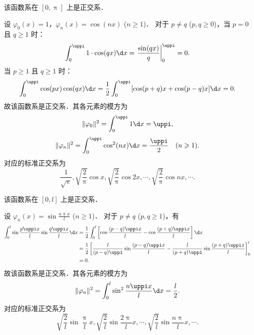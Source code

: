\begin{myproof}
    该函数系在 $[0, \uppi]$ 上是正交系．

    设 $\varphi_0(x) = 1$，$\varphi_n(x) = \cos(nx)$ ($n \geqslant 1$)．
    对于 $p \neq q$ ($p, q \geqslant 0$)，当 $p=0$ 且 $q \geqslant 1$ 时：
    \begin{equation}\label{eq:orth-1-1}
        \int_{0}^{\uppi} 1 \cdot \cos(qx) \d x = \left. \frac{\sin(qx)}{q} \right|_{0}^{\uppi} = 0.
    \end{equation}
    当 $p \geqslant 1$ 且 $q \geqslant 1$ 时：
    \begin{equation}\label{eq:orth-1-2}
        \int_{0}^{\uppi} \cos(px) \cos(qx) \d x = \frac{1}{2} \int_{0}^{\uppi} [\cos(p+q)x + \cos(p-q)x] \d x = 0.
    \end{equation}
    故该函数系是正交系．其各元素的模方为
    \begin{equation}\label{eq:norm-1-1}
        \|\varphi_0\|^2 = \int_{0}^{\uppi} 1 \d x = \uppi,
    \end{equation}
    \begin{equation}\label{eq:norm-1-2}
        \|\varphi_n\|^2 = \int_{0}^{\uppi} \cos^2(nx) \d x = \frac{\uppi}{2} \quad (n \geqslant 1).
    \end{equation}
    对应的标准正交系为
    \begin{equation}
        \boxed{\frac{1}{\sqrt{\uppi}}, \sqrt{\frac{2}{\uppi}}\cos x, \sqrt{\frac{2}{\uppi}}\cos 2x, \cdots, \sqrt{\frac{2}{\uppi}}\cos nx, \cdots}.
    \end{equation}

    该函数系在 $[0, l]$ 上是正交系．

    设 $\varphi_n(x) = \sin \frac{n\uppi x}{l}$ ($n \geqslant 1$)．
    对于 $p \neq q$ ($p, q \geqslant 1$)，有
    \begin{equation}\label{eq:orth-2-1}
        \begin{aligned}
            \int_{0}^{l} \sin \frac{p\uppi x}{l} \sin \frac{q\uppi x}{l} \d x & = \frac{1}{2} \int_{0}^{l} \left[ \cos \frac{(p-q)\uppi x}{l} - \cos \frac{(p+q)\uppi x}{l} \right] \d x                                 \\
                                                                              & = \frac{1}{2} \left[ \frac{l}{(p-q)\uppi} \sin \frac{(p-q)\uppi x}{l} - \frac{l}{(p+q)\uppi} \sin \frac{(p+q)\uppi x}{l} \right]_{0}^{l} \\
                                                                              & = 0.
        \end{aligned}
    \end{equation}
    故该函数系是正交系．其各元素的模方为
    \begin{equation}\label{eq:norm-2}
        \|\varphi_n\|^2 = \int_{0}^{l} \sin^2 \frac{n\uppi x}{l} \d x = \frac{l}{2}.
    \end{equation}
    对应的标准正交系为
    \begin{equation}
        \boxed{\sqrt{\frac{2}{l}}\sin \frac{\uppi}{l}x, \sqrt{\frac{2}{l}}\sin \frac{2\uppi}{l}x, \cdots, \sqrt{\frac{2}{l}}\sin \frac{n\uppi}{l}x, \cdots}.
    \end{equation}


\end{myproof}
